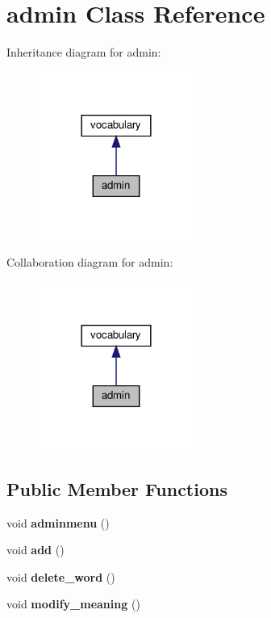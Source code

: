 \hypertarget{classadmin}{}\section{admin Class Reference}
\label{classadmin}


Inheritance diagram for admin\+:\nopagebreak
\begin{figure}[H]
\begin{center}
\leavevmode
\includegraphics[width=144pt]{classadmin__inherit__graph}
\end{center}
\end{figure}


Collaboration diagram for admin\+:\nopagebreak
\begin{figure}[H]
\begin{center}
\leavevmode
\includegraphics[width=144pt]{classadmin__coll__graph}
\end{center}
\end{figure}
\subsection*{Public Member Functions}
\begin{DoxyCompactItemize}
\item 
\mbox{\label{classadmin_a39d5c1977388ccd1c5816cd1586a7d22}} 
void {\bfseries adminmenu} ()
\item 
\mbox{\label{classadmin_aa0f88152929ea72f713d9fe30f4661ca}} 
void {\bfseries add} ()
\item 
\mbox{\label{classadmin_a49bb00bce0e4aa6be4611cd650e034b3}} 
void {\bfseries delete\+\_\+word} ()
\item 
\mbox{\label{classadmin_a33d43e29829005a9f46c581a981a9f0b}} 
void {\bfseries modify\+\_\+meaning} ()
\end{DoxyCompactItemize}
